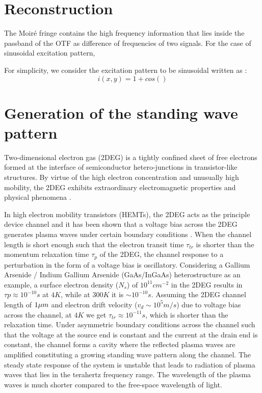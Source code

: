 \documentclass[11pt]{article}
\begin{document}
\section{Reconstruction}

The Moiré fringe contains the high frequency information that lies inside the passband of the OTF as difference of frequencies of two signals. For the case of sinusoidal excitation pattern,

For simplicity, we consider the excitation pattern to be sinusoidal written as \cite{Heintzmann1999a}:
%
\begin{equation}
  i(x,y) = 1 + cos()
\end{equation}
%
\section{Generation of the standing wave pattern}

Two-dimensional electron gas (2DEG) is a tightly confined sheet of free electrons formed at the interface of semiconductor hetero-junctions in transistor-like structures. By virtue of the high electron concentration and unusually high mobility, the 2DEG exhibits extraordinary electromagnetic properties and physical phenomena \cite{Andress_2012,Tsui_1982,Reyren_2007}.

In high electron mobility transistors (HEMTs), the 2DEG acts as the principle device channel and it has been shown that a voltage bias across the 2DEG generates plasma waves under certain boundary conditions \cite{Dyakonov_1993}. When the channel length is short enough such that the electron transit time $\tau_{tr}$ is shorter than the momentum relaxation time $\tau_{p}$ of the 2DEG, the channel response to a perturbation in the form of a voltage bias is  oscillatory. Considering a Gallium Arsenide / Indium Gallium Arsenide (GaAs/InGaAs) heterostructure as an example, a surface electron density ($N_s$) of $10^{11} cm^{-2}$ in the 2DEG results in $\tau{p} \approx 10^{-10} s$ at $4 K$, while at $300 K$ it is $\sim 10^{-10} s$. Assuming the 2DEG channel length of $1 \mu m$ and electron drift velocity ($v_d \sim 10^5 m/s$) due to voltage bias across the channel, at $4 K$ we get $\tau_{tr} \approx 10^{-11} s$, which is shorter than the relaxation time. Under asymmetric boundary conditions across the channel such that the voltage at the source end is constant and the current at the drain end is constant, the channel forms a cavity where the reflected plasma waves are amplified constituting a growing standing wave pattern along the channel. The steady state response of the system is unstable that leads to radiation of plasma waves that lies in the terahertz frequency range. The wavelength of the plasma waves is much shorter compared to the free-space wavelength of light.
\end{document}
